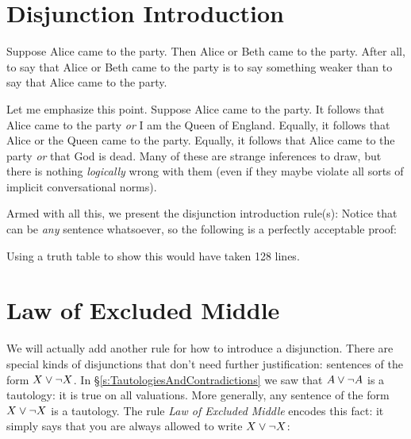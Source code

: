 \section{Disjunction Introduction}
Suppose Alice came to the party. Then Alice or Beth came to the party. After all, to say that Alice or Beth came to the party is to say something weaker than to say that Alice came to the party.

Let me emphasize this point. Suppose Alice came to the party. It follows that Alice came to the party \emph{or} I am the Queen of England. Equally, it follows that Alice or the Queen came to the party.  Equally, it follows that Alice came to the party \emph{or} that God is dead. Many of these are strange inferences to draw, but there is nothing \emph{logically} wrong with them (even if they maybe violate all sorts of implicit conversational norms).

Armed with all this, we present the disjunction introduction rule(s):
Notice that \metaY can be \emph{any} sentence whatsoever, so the following is a perfectly acceptable proof:
\begin{pf}
\end{pf}
Using a truth table to show this would have taken 128 lines.


\section{Law of Excluded Middle}\label{sec:LEM}
We will actually add another rule for how to introduce a disjunction. There are special kinds of disjunctions that don't need further justification: sentences of the form $X\vee\neg X$.
In \S\ref{s:TautologiesAndContradictions} we saw that $A\vee\neg A$ is a tautology: it is true on all valuations. More generally, any sentence of the form $X\vee\neg X$ is a tautology.
The rule \emph{Law of Excluded Middle} encodes this fact: it simply says that you are always allowed to write $X\vee\neg X$:


